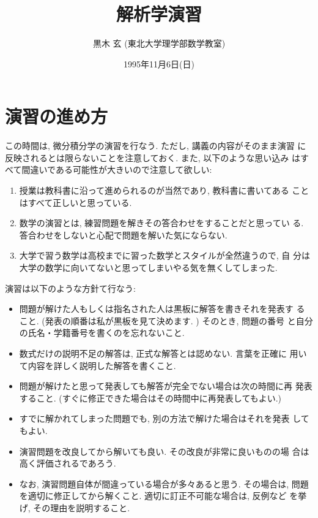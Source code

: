 \documentclass[12pt,twoside]{jarticle}
\begin{document}

\title{\bf 解析学演習}

\author{黒木 玄 \quad (東北大学理学部数学教室)}

\date{1995年11月6日(日)}

\maketitle


\section{演習の進め方}

この時間は, 微分積分学の演習を行なう. ただし, 講義の内容がそのまま演習
に反映されるとは限らないことを注意しておく. また, 以下のような思い込み
はすべて間違いである可能性が大きいので注意して欲しい:

\begin{enumerate}
\item 授業は教科書に沿って進められるのが当然であり, 教科書に書いてある
  ことはすべて正しいと思っている. 
\item 数学の演習とは, 練習問題を解きその答合わせをすることだと思ってい
  る. 答合わせをしないと心配で問題を解いた気にならない. 
\item 大学で習う数学は高校までに習った数学とスタイルが全然違うので, 自
  分は大学の数学に向いてないと思ってしまいやる気を無くしてしまった. 
\end{enumerate}

演習は以下のような方針て行なう:

\begin{itemize}
\item 問題が解けた人もしくは指名された人は黒板に解答を書きそれを発表す
  ること.  (発表の順番は私が黒板を見て決めます. ) そのとき, 問題の番号
  と自分の氏名・学籍番号を書くのを忘れないこと.
\item 数式だけの説明不足の解答は, 正式な解答とは認めない. 言葉を正確に
  用いて内容を詳しく説明した解答を書くこと. 
\item 問題が解けたと思って発表しても解答が完全でない場合は次の時間に再
  発表すること.  (すぐに修正できた場合はその時間中に再発表してもよい.)
\item すでに解かれてしまった問題でも, 別の方法で解けた場合はそれを発表
  してもよい. 
\item 演習問題を改良してから解いても良い. その改良が非常に良いものの場
  合は高く評価されるであろう.
\item なお, 演習問題自体が間違っている場合が多々あると思う. その場合は, 
  問題を適切に修正してから解くこと. 適切に訂正不可能な場合は, 反例など
  を挙げ, その理由を説明すること.
\end{itemize}
\end{document}
